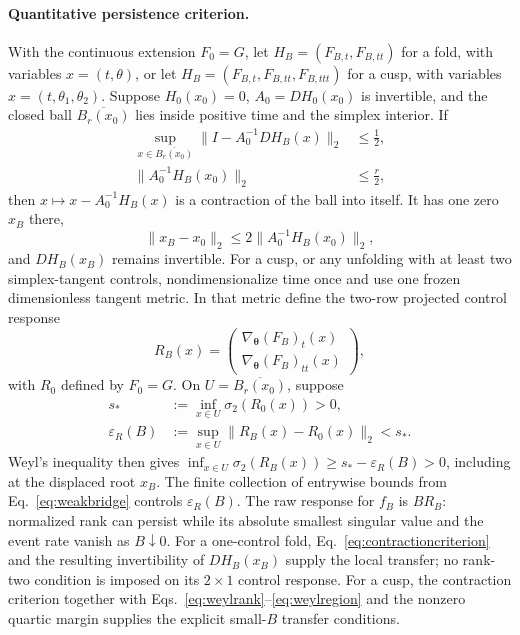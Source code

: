 \documentclass[aps,physrev,reprint,amsmath,amssymb,longbibliography,floatfix]{revtex4-2}
\begin{document}
\paragraph{Quantitative persistence criterion.}
With the continuous extension $F_0=G$, let
$H_B=(F_{B,t},F_{B,tt})$ for a fold, with variables
$x=(t,\theta)$, or let
$H_B=(F_{B,t},F_{B,tt},F_{B,ttt})$ for a cusp, with variables
$x=(t,\theta_1,\theta_2)$.  Suppose $H_0(x_0)=0$,
$A_0=DH_0(x_0)$ is invertible, and the closed ball
$\overline{B_r(x_0)}$ lies inside positive time and the simplex interior.  If
\begin{align}
 \sup_{x\in\overline{B_r(x_0)}}
 \|I-A_0^{-1}DH_B(x)\|_2&\le\tfrac12,\nonumber\\
 \|A_0^{-1}H_B(x_0)\|_2&\le\tfrac r2,
\label{eq:contractioncriterion}
\end{align}
then $x\mapsto x-A_0^{-1}H_B(x)$ is a contraction of the ball into itself.
It has one zero $x_B$ there,
\begin{equation}
 \|x_B-x_0\|_2\le
 2\|A_0^{-1}H_B(x_0)\|_2,
\label{eq:displacement}
\end{equation}
 and $DH_B(x_B)$ remains invertible.  For a cusp, or any unfolding with at
least two simplex-tangent controls, nondimensionalize time once and use one
frozen dimensionless tangent metric.  In that metric define the two-row
projected control response
\begin{equation}
 R_B(x)=
 \begin{pmatrix}
  \nabla_{\bm\theta}(F_B)_t(x)\\
  \nabla_{\bm\theta}(F_B)_{tt}(x)
 \end{pmatrix},
\label{eq:weylrank}
\end{equation}
with $R_0$ defined by $F_0=G$.  On
$U=\overline{B_r(x_0)}$, suppose
\begin{align}
 s_*&:=\inf_{x\in U}\sigma_2(R_0(x))>0,\nonumber\\
 \varepsilon_R(B)&:=\sup_{x\in U}\|R_B(x)-R_0(x)\|_2<s_*.
\label{eq:weylregion}
\end{align}
Weyl's inequality then gives
$\inf_{x\in U}\sigma_2(R_B(x))\ge s_*-\varepsilon_R(B)>0$, including at the
displaced root $x_B$.  The finite collection of entrywise bounds from
Eq.~\eqref{eq:weakbridge} controls $\varepsilon_R(B)$.  The raw response for
$f_B$ is $B R_B$: normalized rank can persist while its absolute smallest
singular value and the event rate vanish as $B\downarrow0$.
For a one-control fold, Eq.~\eqref{eq:contractioncriterion} and the resulting
invertibility of $DH_B(x_B)$ supply the local transfer; no rank-two condition
is imposed on its $2\times1$ control response.  For a cusp, the contraction
criterion together with Eqs.~\eqref{eq:weylrank}--\eqref{eq:weylregion} and
the nonzero quartic margin supplies the explicit small-$B$ transfer conditions.
\end{document}
